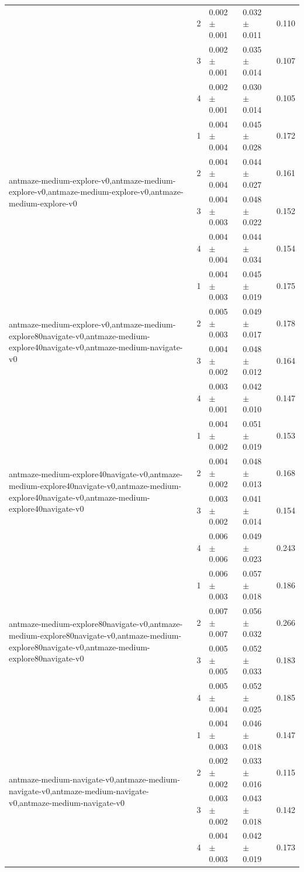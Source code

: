 \begin{tabular}{lllll}
 & 2 & 0.002 $\pm$ 0.001 & 0.032 $\pm$ 0.011 & 0.110 \\
 & 3 & 0.002 $\pm$ 0.001 & 0.035 $\pm$ 0.014 & 0.107 \\
 & 4 & 0.002 $\pm$ 0.001 & 0.030 $\pm$ 0.014 & 0.105 \\
\cline{1-5}
\multirow[t]{4}{*}{antmaze-medium-explore-v0,antmaze-medium-explore-v0,antmaze-medium-explore-v0,antmaze-medium-explore-v0} & 1 & 0.004 $\pm$ 0.004 & 0.045 $\pm$ 0.028 & 0.172 \\
 & 2 & 0.004 $\pm$ 0.004 & 0.044 $\pm$ 0.027 & 0.161 \\
 & 3 & 0.004 $\pm$ 0.003 & 0.048 $\pm$ 0.022 & 0.152 \\
 & 4 & 0.004 $\pm$ 0.004 & 0.044 $\pm$ 0.034 & 0.154 \\
\cline{1-5}
\multirow[t]{4}{*}{antmaze-medium-explore-v0,antmaze-medium-explore80navigate-v0,antmaze-medium-explore40navigate-v0,antmaze-medium-navigate-v0} & 1 & 0.004 $\pm$ 0.003 & 0.045 $\pm$ 0.019 & 0.175 \\
 & 2 & 0.005 $\pm$ 0.003 & 0.049 $\pm$ 0.017 & 0.178 \\
 & 3 & 0.004 $\pm$ 0.002 & 0.048 $\pm$ 0.012 & 0.164 \\
 & 4 & 0.003 $\pm$ 0.001 & 0.042 $\pm$ 0.010 & 0.147 \\
\cline{1-5}
\multirow[t]{4}{*}{antmaze-medium-explore40navigate-v0,antmaze-medium-explore40navigate-v0,antmaze-medium-explore40navigate-v0,antmaze-medium-explore40navigate-v0} & 1 & 0.004 $\pm$ 0.002 & 0.051 $\pm$ 0.019 & 0.153 \\
 & 2 & 0.004 $\pm$ 0.002 & 0.048 $\pm$ 0.013 & 0.168 \\
 & 3 & 0.003 $\pm$ 0.002 & 0.041 $\pm$ 0.014 & 0.154 \\
 & 4 & 0.006 $\pm$ 0.006 & 0.049 $\pm$ 0.023 & 0.243 \\
\cline{1-5}
\multirow[t]{4}{*}{antmaze-medium-explore80navigate-v0,antmaze-medium-explore80navigate-v0,antmaze-medium-explore80navigate-v0,antmaze-medium-explore80navigate-v0} & 1 & 0.006 $\pm$ 0.003 & 0.057 $\pm$ 0.018 & 0.186 \\
 & 2 & 0.007 $\pm$ 0.007 & 0.056 $\pm$ 0.032 & 0.266 \\
 & 3 & 0.005 $\pm$ 0.005 & 0.052 $\pm$ 0.033 & 0.183 \\
 & 4 & 0.005 $\pm$ 0.004 & 0.052 $\pm$ 0.025 & 0.185 \\
\cline{1-5}
\multirow[t]{4}{*}{antmaze-medium-navigate-v0,antmaze-medium-navigate-v0,antmaze-medium-navigate-v0,antmaze-medium-navigate-v0} & 1 & 0.004 $\pm$ 0.003 & 0.046 $\pm$ 0.018 & 0.147 \\
 & 2 & 0.002 $\pm$ 0.002 & 0.033 $\pm$ 0.016 & 0.115 \\
 & 3 & 0.003 $\pm$ 0.002 & 0.043 $\pm$ 0.018 & 0.142 \\
 & 4 & 0.004 $\pm$ 0.003 & 0.042 $\pm$ 0.019 & 0.173 \\
\cline{1-5}
\bottomrule
\end{tabular}
